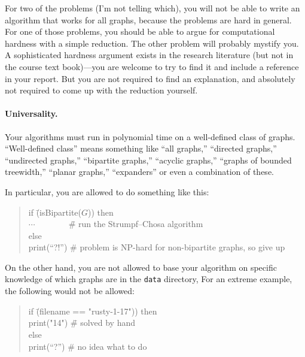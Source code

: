 \documentclass{tufte-handout}
\begin{document}
For two of the problems (I’m not telling which), you will not be able to write an algorithm that works for all graphs, because the problems are hard in general.
For one of those problems, you should be able to argue for computational hardness with a simple reduction.
The other problem will probably mystify you.
A sophisticated hardness argument exists in the research literature (but not in the course text book)---you are welcome to try to find it and include a reference in your report.
But you are not required to find an explanation, and absolutely not required to come up with the reduction yourself. 

\paragraph{Universality.}
Your algorithms must run in polynomial time on a well-defined class of graphs.
“Well-defined class” means something like “all graphs,” “directed graphs,” “undirected graphs,” “bipartite graphs,” “acyclic graphs,” “graphs of bounded treewidth,” “planar graphs,” “expanders” or even a combination of these.

In particular, you are allowed to do something like this: 
\begin{quotation}
  \vspace*{-3ex} \begin{tabbing}
  if \= (isBipartite($G$)) then\\
  \> $\cdots\qquad\qquad$\=\# run the Strumpf--Chosa algorithm \\
  else \\
  \> print(``?!'') \>\# problem is NP-hard for non-bipartite graphs, so give up
\end{tabbing}
\end{quotation}

On the other hand, you are not allowed to base your algorithm on specific knowledge of which graphs are in the {\tt data} directory,
For an extreme example, the following would not be allowed:
\begin{quotation}
  \vspace*{-3ex}
  \begin{tabbing}
  if \= (filename == "rusty-1-17")) then\\
  \> print("14") \=\# solved by hand\\
  else \\
  \> print(``?'') \>\# no idea what to do 
\end{tabbing}
\end{quotation}
\end{document}
